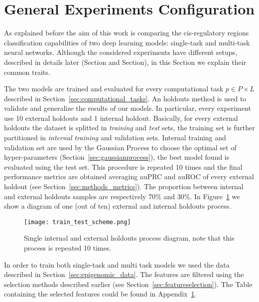 \section{General Experiments Configuration}
As explained before the aim of this work is comparing the  cis-regulatory regions classification capabilities of two deep learning models: single-task and multi-task neural networks. Although the considered experiments have different setups, described in details later (Section and Section), in this Section we explain their common traits. 

The two models are trained and evaluated for every computational task $p \in P \times L$ described in Section~\ref{sec:computational_tasks}. 
An holdouts method is used to validate and generalize the results of our
models. In particular, every experiment use 10 external holdouts and 1 internal
holdout. Basically, for every external
holdouts the dataset is splitted in \emph{training} and \emph{test} sets, the
training set is further partitioned in \emph{internal training} and validation
sets. Internal training and validation set are used by the Gaussian Process to
choose the optimal set of hyper-parameters (Section~\ref{sec:gaussianprocess}),
the best model found is evaluated using the test set. This procedure is
repeated 10 times and the final performance metrics are obtained averaging auPRC
and auROC of every external holdout (see Section~\ref{sec:methods_metrics}). The proportion between internal and external holdouts samples are respectively 70\% and 30\%. In Figure~\ref{fig:train_test_diagram} we show a diagram of one (out of ten) external and internal holdouts process. 
\begin{figure}[ht]
\centering
\texttt{[image: train\_test\_scheme.png]}
\caption{Single internal and external holdouts process diagram, note that this
process is repeated 10 times.} 
\label{fig:train_test_diagram}
\end{figure}
In order to train both single-task and multi task models we used the data described in Section~\ref{sec:epigenomic_data}. The features are filtered using the selection methods described earlier (see Section~\ref{sec:featureselection}). The Table containing the selected features could be found in Appendix~\ref{}.

